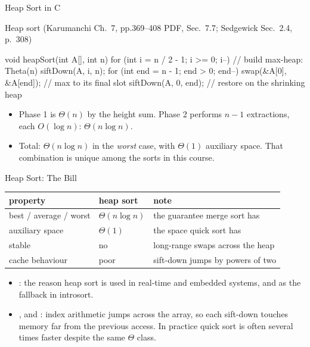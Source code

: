 \documentclass[aspectratio=169]{beamer}
\begin{document}
\begin{frame}[fragile]{Heap Sort in C}
  \footnotesize
  \begin{block}{Heap sort (Karumanchi Ch.~7, pp.369--408 PDF, Sec.~7.7;
    Sedgewick Sec.~2.4, p.~308)
    \cite{Karumanchi2017_data_structures_algorithms_made_easy,Sedgewick2011_algorithms}}
\begin{semiverbatim}
void heapSort(int A[], int n) {
  for (int i = n / 2 - 1; i >= 0; i--)   // build max-heap: Theta(n)
    siftDown(A, i, n);
  for (int end = n - 1; end > 0; end--) {
    swap(&A[0], &A[end]);                // max to its final slot
    siftDown(A, 0, end);                 // restore on the shrinking heap
  }
}
\end{semiverbatim}
  \end{block}
  \begin{itemize}
    \item Phase 1 is $\Theta(n)$ by the height sum. Phase 2 performs $n-1$
      extractions, each $O(\log n)$: $\Theta(n\log n)$.
    \item Total: $\Theta(n\log n)$ in the \emph{worst} case, with
      $\Theta(1)$ auxiliary space. That combination is unique among the sorts
      in this course.
  \end{itemize}
\end{frame}

\begin{frame}{Heap Sort: The Bill}
  \begin{center}
  {\footnotesize
  \begin{tabular}{lll}
    \toprule
    \textbf{property} & \textbf{heap sort} & \textbf{note} \\
    \midrule
    best / average / worst & $\Theta(n\log n)$ & the guarantee merge sort has \\
    auxiliary space & $\Theta(1)$ & the space quick sort has \\
    stable & no & long-range swaps across the heap \\
    cache behaviour & poor & sift-down jumps by powers of two \\
    \bottomrule
  \end{tabular}}
  \end{center}
  \begin{itemize}
    \item {}: the reason heap
      sort is used in real-time and embedded systems, and as the fallback in
      introsort.
    \item {}, and : index arithmetic
      jumps across the array, so each sift-down touches memory far from the
      previous access. In practice quick sort is often several times faster
      despite the same $\Theta$ class.
  \end{itemize}
\end{frame}
\end{document}

